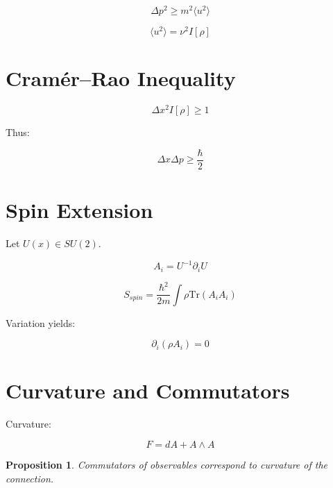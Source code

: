 \documentclass[11pt]{article}
\newtheorem{proposition}{Proposition}
\begin{document}
\begin{equation}
\Delta p^2 \ge m^2 \langle u^2 \rangle
\end{equation}

\begin{equation}
\langle u^2 \rangle = \nu^2 I[\rho]
\end{equation}

\section{Cram\'er--Rao Inequality}

\begin{equation}
\Delta x^2 I[\rho] \ge 1
\end{equation}

Thus:

\begin{equation}
\Delta x \Delta p \ge \frac{\hbar}{2}
\end{equation}

\section{Spin Extension}

Let $U(x)\in SU(2)$.

\begin{equation}
A_i = U^{-1}\partial_i U
\end{equation}

\begin{equation}
S_{spin} = \frac{\hbar^2}{2m}\int \rho \mathrm{Tr}(A_i A_i)
\end{equation}

Variation yields:

\begin{equation}
\partial_i(\rho A_i)=0
\end{equation}

\section{Curvature and Commutators}

Curvature:

\begin{equation}
F = dA + A \wedge A
\end{equation}

\begin{proposition}
Commutators of observables correspond to curvature of the connection.
\end{proposition}
\end{document}

